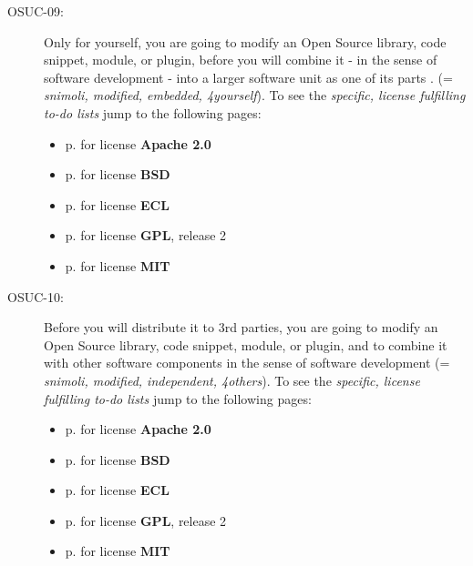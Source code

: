 \begin{description}
\item[OSUC-09:]\label{OSUC-09-DEF} Only for yourself, you are going to modify an
Open Source library, code snippet, module, or plugin, before you will combine it
- in the sense of software development - into a larger software unit as one of
its parts . (= \textit{snimoli, modified, embedded, 4yourself}). 
To see the \textit{specific, license fulfilling to-do lists} jump to the
following pages:
  \begin{itemize}
    \item p. \pageref{OSUC-09-Apache20} for license \textbf{Apache 2.0}
    \item p. \pageref{OSUC-09-BSD} for license \textbf{BSD}
    \item p. \pageref{OSUC-09-ECL} for license \textbf{ECL}
    \item p. \pageref{OSUC-09-GPL2X} for license \textbf{GPL}, release 2
    \item p. \pageref{OSUC-09-MIT} for license \textbf{MIT}
  \end{itemize}

\item[OSUC-10:]\label{OSUC-10-DEF} Before you will distribute it to 3rd parties,
you are going to modify an Open Source library, code snippet, module, or plugin,
and to combine it with other software components in the sense of
software development (= \textit{snimoli, modified, independent, 4others}). 
To see the \textit{specific, license fulfilling to-do lists} jump to the
following pages:
  \begin{itemize}
    \item p. \pageref{OSUC-10-Apache20} for license \textbf{Apache 2.0}
    \item p. \pageref{OSUC-10-BSD} for license \textbf{BSD}
    \item p. \pageref{OSUC-10-ECL} for license \textbf{ECL}
    \item p. \pageref{OSUC-10-GPL2X} for license \textbf{GPL}, release 2
    \item p. \pageref{OSUC-10-MIT} for license \textbf{MIT}
  \end{itemize}
\end{description}

%
